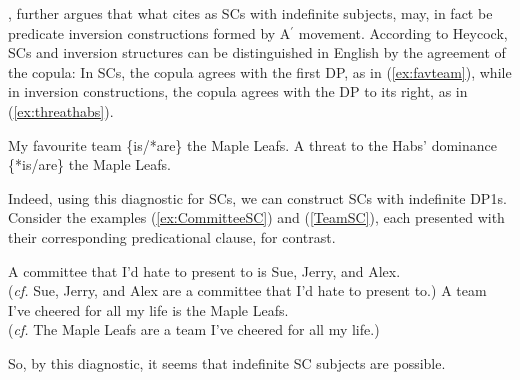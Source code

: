 \documentclass[
	letterpaper,
]{article}
\begin{document}
%
%
%
%
\textcite{heycock2012specification}, further argues that what \textcite{mikkelsen2005copular} cites as SCs with indefinite subjects, may, in fact be predicate inversion constructions formed by A$^{\prime}$ movement.
According to Heycock, SCs and inversion structures can be distinguished in English by the agreement of the copula:
In SCs, the copula agrees with the first DP, as in (\ref{ex:favteam}), while in inversion constructions, the copula agrees with the DP to its right, as in (\ref{ex:threathabs}).
\begin{exe}
	\ex My favourite team \{is/*are\} the Maple Leafs.\label{ex:favteam}
	\ex A threat to the Habs' dominance \{*is/are\} the Maple Leafs.\label{ex:threathabs}
\end{exe}
Indeed, using this diagnostic for SCs, we can construct SCs with indefinite DP1s.
Consider the examples (\ref{ex:CommitteeSC}) and (\ref{TeamSC}), each presented with their corresponding predicational clause, for contrast.
\begin{exe}
	\ex\label{ex:CommitteeSC} A committee that I'd hate to present to is Sue, Jerry, and Alex.\\
(\textit{cf.} Sue, Jerry, and Alex are a committee that I'd hate to present to.)
	\ex\label{ex:TeamSC} A team I've cheered for all my life is the Maple Leafs.\\
(\textit{cf.} The Maple Leafs are a team I've cheered for all my life.)
\end{exe}
So, by this diagnostic, it seems that indefinite SC subjects are possible.
\end{document}
